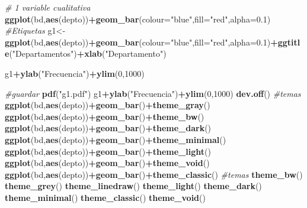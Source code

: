 \documentclass[
]{book}
\newenvironment{Shaded}{\begin{snugshade}}{\end{snugshade}}
\newcommand{\CommentTok}[1]{\textcolor[rgb]{0.56,0.35,0.01}{\textit{#1}}}
\newcommand{\DataTypeTok}[1]{\textcolor[rgb]{0.13,0.29,0.53}{#1}}
\newcommand{\DecValTok}[1]{\textcolor[rgb]{0.00,0.00,0.81}{#1}}
\newcommand{\FloatTok}[1]{\textcolor[rgb]{0.00,0.00,0.81}{#1}}
\newcommand{\KeywordTok}[1]{\textcolor[rgb]{0.13,0.29,0.53}{\textbf{#1}}}
\newcommand{\NormalTok}[1]{#1}
\newcommand{\OperatorTok}[1]{\textcolor[rgb]{0.81,0.36,0.00}{\textbf{#1}}}
\newcommand{\StringTok}[1]{\textcolor[rgb]{0.31,0.60,0.02}{#1}}
\begin{document}
\begin{Shaded}
\begin{Highlighting}[]
\CommentTok{# 1 variable cualitativa}
\KeywordTok{ggplot}\NormalTok{(bd,}\KeywordTok{aes}\NormalTok{(depto))}\OperatorTok{+}\KeywordTok{geom_bar}\NormalTok{(}\DataTypeTok{colour=}\StringTok{"blue"}\NormalTok{,}\DataTypeTok{fill=}\StringTok{"red"}\NormalTok{,}\DataTypeTok{alpha=}\FloatTok{0.1}\NormalTok{)}
\CommentTok{#Etiquetas}
\NormalTok{g1<-}\KeywordTok{ggplot}\NormalTok{(bd,}\KeywordTok{aes}\NormalTok{(depto))}\OperatorTok{+}\KeywordTok{geom_bar}\NormalTok{(}\DataTypeTok{colour=}\StringTok{"blue"}\NormalTok{,}\DataTypeTok{fill=}\StringTok{"red"}\NormalTok{,}\DataTypeTok{alpha=}\FloatTok{0.1}\NormalTok{)}\OperatorTok{+}\KeywordTok{ggtitle}\NormalTok{(}\StringTok{"Departamentos"}\NormalTok{)}\OperatorTok{+}\KeywordTok{xlab}\NormalTok{(}\StringTok{"Departamento"}\NormalTok{)}

\NormalTok{g1}\OperatorTok{+}\KeywordTok{ylab}\NormalTok{(}\StringTok{"Frecuencia"}\NormalTok{)}\OperatorTok{+}\KeywordTok{ylim}\NormalTok{(}\DecValTok{0}\NormalTok{,}\DecValTok{1000}\NormalTok{)}

\CommentTok{#guardar }
\KeywordTok{pdf}\NormalTok{(}\StringTok{"g1.pdf"}\NormalTok{)}
\NormalTok{g1}\OperatorTok{+}\KeywordTok{ylab}\NormalTok{(}\StringTok{"Frecuencia"}\NormalTok{)}\OperatorTok{+}\KeywordTok{ylim}\NormalTok{(}\DecValTok{0}\NormalTok{,}\DecValTok{1000}\NormalTok{)}
\KeywordTok{dev.off}\NormalTok{()}
\CommentTok{#temas }
\KeywordTok{ggplot}\NormalTok{(bd,}\KeywordTok{aes}\NormalTok{(depto))}\OperatorTok{+}\KeywordTok{geom_bar}\NormalTok{()}\OperatorTok{+}\KeywordTok{theme_gray}\NormalTok{()}
\KeywordTok{ggplot}\NormalTok{(bd,}\KeywordTok{aes}\NormalTok{(depto))}\OperatorTok{+}\KeywordTok{geom_bar}\NormalTok{()}\OperatorTok{+}\KeywordTok{theme_bw}\NormalTok{()}
\KeywordTok{ggplot}\NormalTok{(bd,}\KeywordTok{aes}\NormalTok{(depto))}\OperatorTok{+}\KeywordTok{geom_bar}\NormalTok{()}\OperatorTok{+}\KeywordTok{theme_dark}\NormalTok{()}
\KeywordTok{ggplot}\NormalTok{(bd,}\KeywordTok{aes}\NormalTok{(depto))}\OperatorTok{+}\KeywordTok{geom_bar}\NormalTok{()}\OperatorTok{+}\KeywordTok{theme_minimal}\NormalTok{()}
\KeywordTok{ggplot}\NormalTok{(bd,}\KeywordTok{aes}\NormalTok{(depto))}\OperatorTok{+}\KeywordTok{geom_bar}\NormalTok{()}\OperatorTok{+}\KeywordTok{theme_light}\NormalTok{()}
\KeywordTok{ggplot}\NormalTok{(bd,}\KeywordTok{aes}\NormalTok{(depto))}\OperatorTok{+}\KeywordTok{geom_bar}\NormalTok{()}\OperatorTok{+}\KeywordTok{theme_void}\NormalTok{()}
\KeywordTok{ggplot}\NormalTok{(bd,}\KeywordTok{aes}\NormalTok{(depto))}\OperatorTok{+}\KeywordTok{geom_bar}\NormalTok{()}\OperatorTok{+}\KeywordTok{theme_classic}\NormalTok{()}
\CommentTok{#temas}
\KeywordTok{theme_bw}\NormalTok{()}
\KeywordTok{theme_grey}\NormalTok{()}
\KeywordTok{theme_linedraw}\NormalTok{()}
\KeywordTok{theme_light}\NormalTok{()}
\KeywordTok{theme_dark}\NormalTok{()}
\KeywordTok{theme_minimal}\NormalTok{()}
\KeywordTok{theme_classic}\NormalTok{()}
\KeywordTok{theme_void}\NormalTok{()}
\end{Highlighting}
\end{Shaded}
\end{document}
